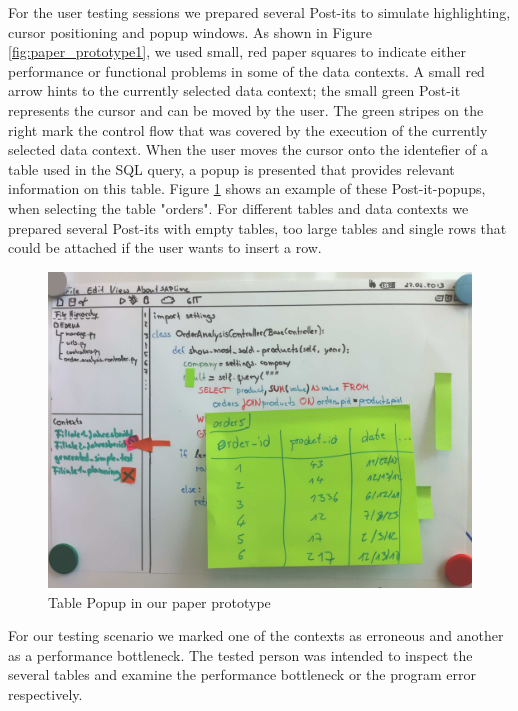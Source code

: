 For the user testing sessions we prepared several Post-its to simulate highlighting, cursor positioning and popup windows. 
As shown in Figure \ref{fig:paper_prototype1}, we used small, red paper squares to indicate either performance or functional problems in some of the data contexts. 
A small red arrow hints to the currently selected data context; the small green Post-it represents the cursor and can be moved by the user. The green stripes on the right mark the control flow that was covered by the execution of the currently selected data context. 
When the user moves the cursor onto the identefier of a table used in the SQL query, a popup is presented that provides relevant information on this table.
Figure \ref{fig:paper_prototype2} shows an example of these Post-it-popups, when selecting the table "orders". For different tables and data contexts we prepared several Post-its with empty tables, too large tables and single rows that could be attached if the user wants to insert a row.

\begin{figure}
\begin{centering}
    \includegraphics[width=1.0\linewidth]{images/paper_prototype2}
    \caption{Table Popup in our paper prototype}
    \label{fig:paper_prototype2}
\end{centering}
\end{figure}

For our testing scenario we marked one of the contexts as erroneous and another as a performance bottleneck. The tested person was intended to inspect the several tables and examine the performance bottleneck or the program error respectively.







